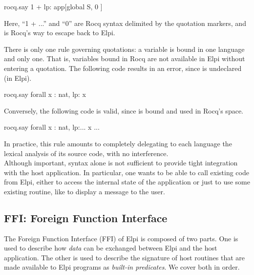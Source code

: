 \documentclass{these-ISSS}
\newenvironment{elpicode}
  {\VerbatimEnvironment\begin{elpibox}\begin{xelpicode}}{\end{xelpicode}
\end{elpibox}}
\begin{document}
\begin{elpicode}
  rocq.say {{ 1 + lp:{{ app[global S, {{ 0  }} ]  }}    }}
\end{elpicode}

\noindent
Here, ``1 + ...'' and ``0'' are Rocq syntax delimited by the quotation
markers, and  is Rocq's way to escape back to Elpi.


There is only one rule governing quotations: a variable is bound in one language and only one. That
is, variables bound in Rocq are not available in Elpi without entering a
quotation. The following code results in an error, since  is undeclared
(in Elpi).

\begin{elpicode}
  rocq.say {{ forall x : nat, lp:{{ x }} }}
\end{elpicode}


\noindent
Conversely, the following code is valid, since  is bound and used in
Rocq's space.
\begin{elpicode}
rocq.say {{ forall x : nat, lp:{{... {{ x }} ...}} }}
\end{elpicode}
\noindent
In practice, this rule amounts to completely delegating to each language the
lexical analysis of its source code, with no interference.
~\\

Although important, syntax alone is not sufficient to provide tight integration with the host
application. In particular, one wants to be able to call existing code from
Elpi, either to access the internal state of the application or just to use
some existing routine, like  to display a message to the user.


\subsection{FFI: Foreign Function Interface}\label{FFI}

The Foreign Function Interface (FFI) of Elpi is composed of two parts. One is
used to describe how \emph{data} can be exchanged between Elpi and the host
application. The other is used to describe the signature of host routines that
are made available to Elpi programs as \emph{built-in predicates}. We cover
both in order.


\end{document}
